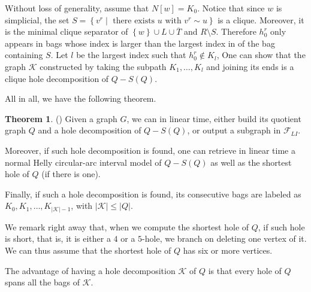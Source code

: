 \documentclass{article}
\theoremstyle{definition}
\newtheorem{thm}{Theorem}[section]
\begin{document}
    Without loss of generality,
    assume that $N\left[w\right] = K_0$.
    Notice that since $w$ is
    simplicial, the set
    $S = \left\{v^{r} \mid \text{ there exists
    $u$ with } v^{r} \sim u\right\}$ 
    is a clique. Moreover, 
    it is the minimal 
    clique separator of
    $\left\{w\right\} \cup L \cup \overline{T}$
    and $R \setminus S$.
    Therefore $h_0^{r}$ 
    only appears in bags
    whose index is larger
    than the largest index in
    of the bag containing $S$.
    Let $l$ be the largest
    index such that $h_0^{r} \not\in K_{l}$,
    One can show that the graph $\mathcal{K}$
    constructed by taking
    the subpath $K_1, \ldots, K_{l}$ 
    and joining its ends is
    a clique hole decomposition
    of $Q - S\left(Q\right)$.
    
    All in all, we have the following 
    theorem.

    \begin{thm} (\cite{main})
        Given a graph $G$, we
        can in linear time, either
        build its quotient graph
        $Q$ and a hole decomposition
        of $Q - S\left(Q\right)$,
        or output a subgraph
        in $\mathcal{F}_{LI}$.
        
        Moreover, if such hole
        decomposition is found,
        one can retrieve in linear
        time a normal Helly
        circular-arc
        interval model of $Q - S\left(Q\right)$
        as well as the shortest hole 
        of $Q$ (if there is one).
    
        Finally, if such a hole 
        decomposition is found,
        its consecutive bags are
        labeled as $K_0, K_1, \ldots, K_{\left|\mathcal{K}\right|-1}$,
        with $\left|\mathcal{K}\right| \leq \left|Q\right|$.
        \label{olive-ring}
    \end{thm}

    We remark right away
    that, when we compute
    the shortest hole of $Q$,
    if such hole is short,
    that is, it is either 
    a $4$ or a $5$-hole, 
    we branch on deleting one vertex of it.
    We can thus assume
    that the shortest
    hole of $Q$ has
    six or more vertices.
        
    The advantage of having a hole
    decomposition $\mathcal{K}$ of $Q$ is 
    that every hole of $Q$
    spans all the bags of $\mathcal{K}$.
\end{document}
